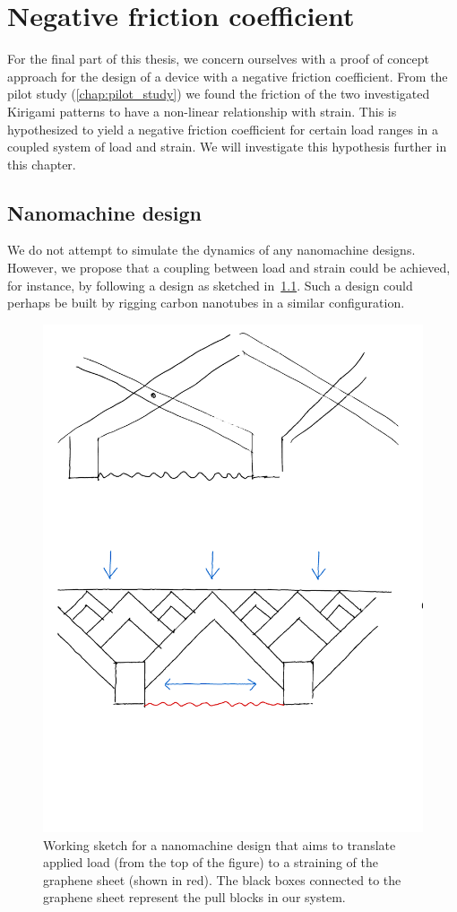 \chapter{Negative friction coefficient}\label{chap:negative_coef}
For the final part of this thesis, we concern ourselves with a proof of concept approach for the design of a device with a negative friction coefficient. From the pilot study (\cref{chap:pilot_study}) we found the friction of the two investigated Kirigami patterns to have a non-linear relationship with strain. This is hypothesized to yield a negative friction coefficient for certain load ranges in a coupled system of load and strain. We will investigate this hypothesis further in this chapter.

\section{Nanomachine design}
We do not attempt to simulate the dynamics of any nanomachine designs. However, we propose that a coupling between load and strain could be achieved, for instance, by following a design as sketched in~\cref{fig:nanomachine}. Such a design could perhaps be built by rigging carbon nanotubes in a similar configuration. 

\begin{figure}[H]
  \centering
  \includegraphics[width=0.5\linewidth]{figures/negative_coefficient/nanomachine.pdf}
  \caption{Working sketch for a nanomachine design that aims to translate applied load (from the top of the figure) to a straining of the graphene sheet (shown in red). The black boxes connected to the graphene sheet represent the pull blocks in our system.}
  \label{fig:nanomachine}
\end{figure}

